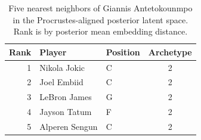 \begin{table}[htbp]
  \centering\small
  \begin{tabular}{rllc}
    \toprule
    Rank & Player & Position & Archetype \\
    \midrule
    1 & Nikola Jokic & C & 2 \\
    2 & Joel Embiid & C & 2 \\
    3 & LeBron James & G & 2 \\
    4 & Jayson Tatum & F & 2 \\
    5 & Alperen Sengun & C & 2 \\
    \bottomrule
  \end{tabular}
  \caption{Five nearest neighbors of Giannis Antetokounmpo in the Procrustes-aligned posterior latent space. Rank is by posterior mean embedding distance.}
  \label{tab:Giannis_Antetokounmpo_neighbors}
\end{table}

